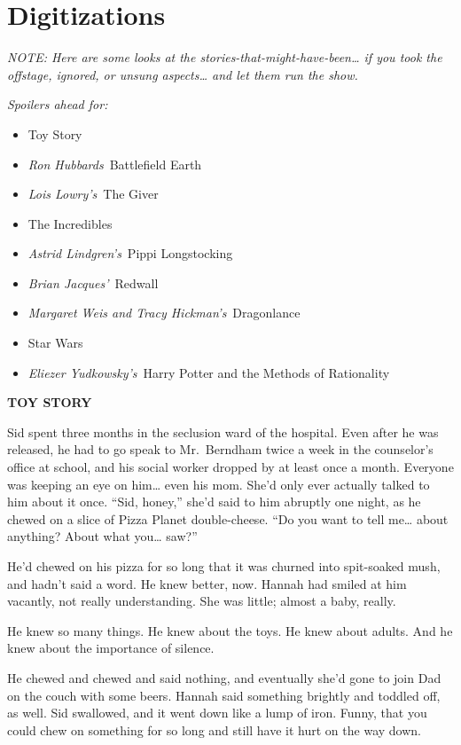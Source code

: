 \Startbonus

\hypertarget{digitizations}{%
\chapter{Digitizations}\label{digitizations}}

\emph{NOTE: Here are some looks at the
stories-that-might-have-been\ldots{} if you took the offstage, ignored,
or unsung aspects\ldots{} and let them run the show.}

\emph{Spoilers ahead for:}

\begin{itemize}
\tightlist
\item
  Toy Story
\item
  \emph{Ron Hubbards}~Battlefield Earth
\item
  \emph{Lois Lowry's}~The Giver
\item
  The Incredibles
\item
  \emph{Astrid Lindgren's}~Pippi Longstocking
\item
  \emph{Brian Jacques'}~Redwall
\item
  \emph{Margaret Weis and Tracy Hickman's}~Dragonlance
\item
  Star Wars
\item
  \emph{Eliezer Yudkowsky's}~Harry Potter and the Methods of
  Rationality\\
\end{itemize}

\textbf{TOY STORY}

Sid spent three months in the seclusion ward of the hospital. Even after
he was released, he had to go speak to Mr.~Berndham twice a week in the
counselor's office at school, and his social worker dropped by at least
once a month. Everyone was keeping an eye on him\ldots{} even his mom.
She'd only ever actually talked to him about it once. ``Sid, honey,''
she'd said to him abruptly one night, as he chewed on a slice of Pizza
Planet double-cheese. ``Do you want to tell me\ldots{} about anything?
About what you\ldots{} saw?''

He'd chewed on his pizza for so long that it was churned into
spit-soaked mush, and hadn't said a word. He knew better, now. Hannah
had smiled at him vacantly, not really understanding. She was little;
almost a baby, really.

He knew so many things. He knew about the toys. He knew about adults.
And he knew about the importance of silence.

He chewed and chewed and said nothing, and eventually she'd gone to join
Dad on the couch with some beers. Hannah said something brightly and
toddled off, as well. Sid swallowed, and it went down like a lump of
iron. Funny, that you could chew on something for so long and still have
it hurt on the way down.

